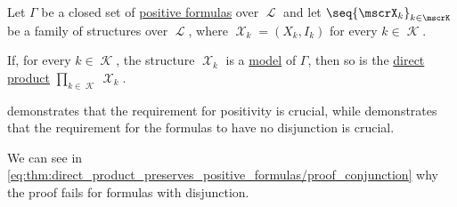 \begin{proposition}\label{thm:direct_product_preserves_positive_formulas}
  Let \( \Gamma \) be a closed set of \hyperref[def:positive_formula]{positive formulas}  over \( \mscrL \) and let \( \seq{ \mscrX_k }_{k \in \mscrK} \) be a family of structures over \( \mscrL \), where \( \mscrX_k = (X_k, I_k) \) for every \( k \in \mscrK \).

  If, for every \( k \in \mscrK \), the structure \( \mscrX_k \) is a \hyperref[def:first_order_model]{model} of \( \Gamma \), then so is the \hyperref[def:first_order_direct_product]{direct product} \( \prod_{k \in \mscrK} \mscrX_k \).
\end{proposition}
\begin{comments}
  \item {} demonstrates that the requirement for positivity is crucial, while  demonstrates that the requirement for the formulas to have no disjunction is crucial.

  \item We can see in \eqref{eq:thm:direct_product_preserves_positive_formulas/proof_conjunction} why the proof fails for formulas with disjunction.
\end{comments}
